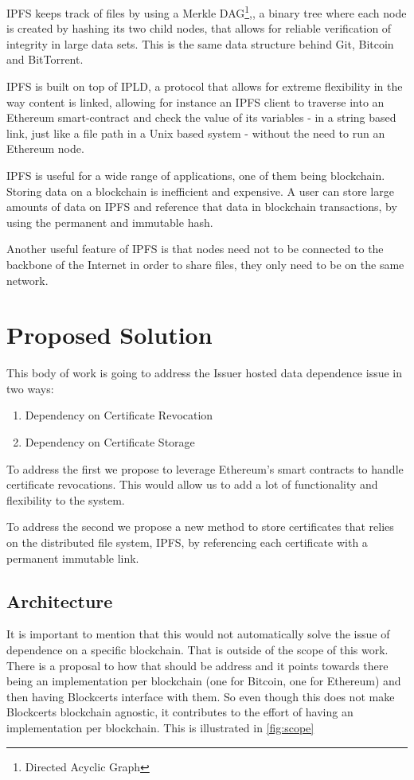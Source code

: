 \documentclass[llncsdoc]{llncs}
\begin{document}
IPFS keeps track of files by using a Merkle DAG\footnote{Directed Acyclic Graph},\cite{Merkle:1987jk}, a binary tree where each node is created by hashing its two child nodes, that allows for reliable verification of integrity in large data sets. This is the same data structure behind Git, Bitcoin and BitTorrent.

IPFS is built on top of IPLD, a protocol that allows for extreme flexibility in the way content is linked, allowing for instance an IPFS client to traverse into an Ethereum smart-contract and check the value of its variables - in a string based link, just like a file path in a Unix based system - without the need to run an Ethereum node.

IPFS is useful for a wide range of applications, one of them being blockchain. Storing data on a blockchain is inefficient and expensive. A user can store large amounts of data on IPFS and reference that data in blockchain transactions, by using the permanent and immutable hash.

Another useful feature of IPFS is that nodes need not to be connected to the backbone of the Internet in order to share files, they only need to be on the same network.

\section{Proposed Solution}
This body of work is going to address the Issuer hosted data dependence issue in two ways: 
\begin{enumerate}
    \item Dependency on Certificate Revocation
    \item Dependency on Certificate Storage
\end{enumerate}

To address the first we propose to leverage Ethereum's smart contracts to handle certificate revocations. This would allow us to add a lot of functionality and flexibility to the system.

To address the second we propose a new method to store certificates that relies on the distributed file system, IPFS, by referencing each certificate with a permanent immutable link.


\subsection{Architecture}
It is important to mention that this would not automatically solve the issue of dependence on a specific blockchain. That is outside of the scope of this work. There is a proposal to how that should be address and it points towards there being an implementation per blockchain (one for Bitcoin, one for Ethereum) and then having Blockcerts interface with them. So even though this does not make Blockcerts blockchain agnostic, it contributes to the effort of having an implementation per blockchain. This is illustrated in \ref{fig:scope}
\end{document}
